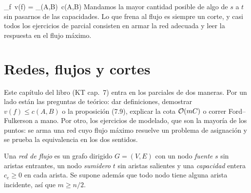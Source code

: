 
\newcommand{\flout}{f^{\mathrm{out}}}
\newcommand{\flin}{f^{\mathrm{in}}}
\newcommand{\flGf}{G_f}
\newcommand{\flcuello}{\operatorname{cuello}}
\newcommand{\flnodosej}{%
  \node[flv] (s) at (0,0) {$s$};
  \node[flv] (a) at (1.55,0.95) {$a$};
  \node[flv] (b) at (1.55,-0.95) {$b$};
  \node[flv] (t) at (3.1,0) {$t$};}

  {\max_{f}\, v(f) \;=\; \min_{(A,B)}\, c(A,B)}
  {Mandamos la mayor cantidad posible de algo de $s$ a $t$ sin pasarnos de las capacidades. Lo que frena al flujo es siempre un corte, y casi todos los ejercicios de parcial consisten en armar la red adecuada y leer la respuesta en el flujo máximo.}

\section{Redes, flujos y cortes}

Este capítulo del libro (KT cap.~7) entra en los parciales de dos maneras. Por un lado están las preguntas de teórico: dar definiciones, demostrar $v(f)\le c(A,B)$ o la proposición (7.9), explicar la cota $\mathcal{O}(mC)$ o correr Ford–Fulkerson a mano. Por otro, los ejercicios de modelado, que son la mayoría de los puntos: se arma una red cuyo flujo máximo resuelve un problema de asignación y se prueba la equivalencia en los dos sentidos.

\begin{definicion}
Una \emph{red de flujo} es un grafo dirigido $G=(V,E)$ con un nodo \emph{fuente} $s$ sin aristas entrantes, un nodo \emph{sumidero} $t$ sin aristas salientes y una \emph{capacidad} entera $c_e\ge 0$ en cada arista. Se supone además que todo nodo tiene alguna arista incidente, así que $m\ge n/2$.
\end{definicion}

